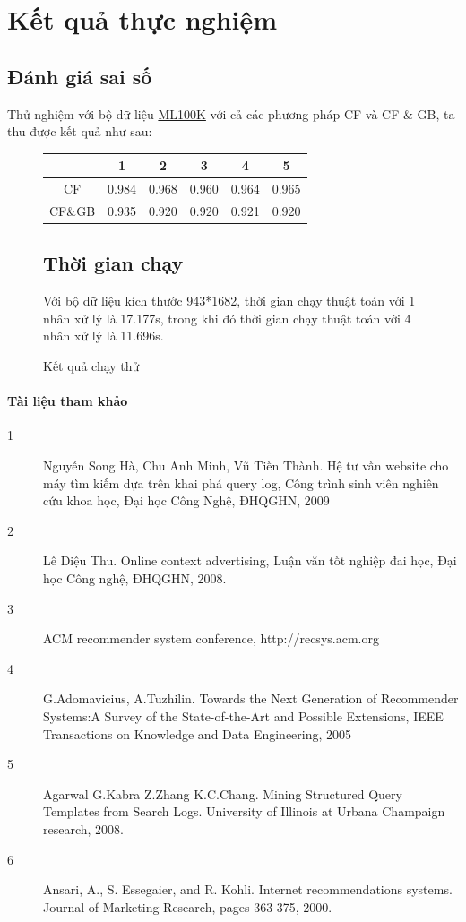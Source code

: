\documentclass{report}
\begin{document}
	
	\section{Kết quả thực nghiệm}
	\subsection{Đánh giá sai số}
	Thử nghiệm với bộ dữ liệu \href{http://files.grouplens.org/datasets/movielens/ml-100k.zip}{ML100K} với cả các phương pháp CF và CF \& GB, ta thu được kết quả như sau:\\
	\begin{figure}[h!]
		\centering
	\begin{tabular}{|c|c|c|c|c|c|}
		\hline & 1 & 2 & 3 & 4 & 5\\
		\hline CF &  0.984&  0.968&  0.960& 0.964 & 0.965\\ 
		\hline CF\&GB &  0.935& 0.920 & 0.920 &  0.921 & 0.920\\ 
		\hline 
	\end{tabular}
	\caption{Kết quả chạy thử} 
	
	\subsection{Thời gian chạy}
	Với bộ dữ liệu kích thước 943*1682, thời gian chạy thuật toán với 1 nhân xử lý là 17.177s, trong khi đó thời gian chạy thuật toán với 4 nhân xử lý là 11.696s.
\end{figure}
	
	\clearpage
\newpage
\paragraph{Tài liệu tham khảo}	
\begin{description}
	\item [1] Nguyễn Song Hà, Chu Anh Minh, Vũ Tiến Thành. Hệ tư vấn website cho máy tìm
	kiếm dựa trên khai phá query log, Công trình sinh viên nghiên cứu khoa học, Đại học
	Công Nghệ, ĐHQGHN, 2009
	
	\item [2] Lê Diệu Thu. Online context advertising, Luận văn tốt nghiệp đai học, Đại học
	Công nghệ, ĐHQGHN, 2008.
	
	\item[3] ACM recommender system conference, http://recsys.acm.org
	\item [4] G.Adomavicius, A.Tuzhilin. Towards the Next Generation of Recommender
	Systems:A Survey of the State-of-the-Art and Possible Extensions, IEEE Transactions
	on Knowledge and Data Engineering, 2005
	\item [5] Agarwal G.Kabra Z.Zhang K.C.Chang. Mining Structured Query Templates from
	Search Logs. University of Illinois at Urbana Champaign research, 2008.
	\item [6] Ansari, A., S. Essegaier, and R. Kohli. Internet recommendations systems. Journal
	of Marketing Research, pages 363-375, 2000.
	\end{description}
	
	
	
	
\end{document}
